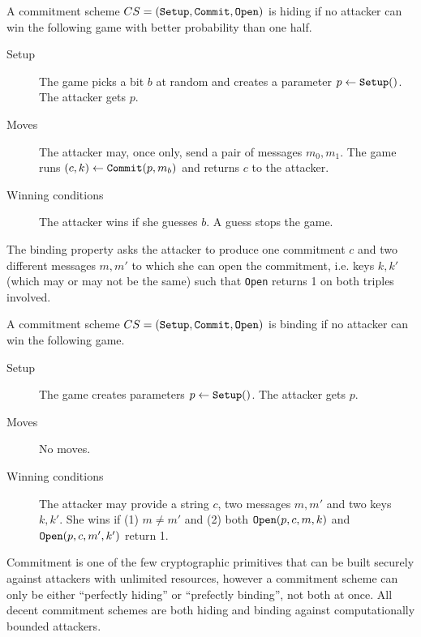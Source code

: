\documentclass[envcountsame]{llncs}
\newcommand{\alg}[1]{\textup{\texttt{#1}}}
\begin{document}
\begin{definition}
A commitment scheme $CS = (\alg{Setup}, \alg{Commit}, \alg{Open})$ is hiding if
no attacker can win the following game with better probability than one half.

\begin{description}
\item[Setup]
The game picks a bit $b$ at random and creates a parameter $p \gets
\alg{Setup}()$. The attacker gets $p$.

\item[Moves]
The attacker may, once only, send a pair of messages $m_0, m_1$. The game runs
$(c, k) \gets \alg{Commit}(p, m_b)$ and returns $c$ to the attacker.

\item[Winning conditions]
The attacker wins if she guesses $b$. A guess stops the game.
\end{description}
\end{definition}

The binding property asks the attacker to produce one commitment $c$ and two
different messages $m, m'$ to which she can open the commitment, i.e. keys
$k, k'$ (which may or may not be the same) such that \alg{Open} returns 1 on
both triples involved.

\begin{definition}
A commitment scheme $CS = (\alg{Setup}, \alg{Commit}, \alg{Open})$ is binding
if no attacker can win the following game.

\begin{description}
\item[Setup]
The game creates parameters $p \gets \alg{Setup}()$. The attacker gets $p$.

\item[Moves]
No moves.

\item[Winning conditions]
The attacker may provide a string $c$, two messages $m, m'$ and two keys $k,
k'$. She wins if (1) $m \neq m'$ and (2) both $\alg{Open}(p, c, m, k)$ and
$\alg{Open}(p, c, m', k')$ return 1.
\end{description}
\end{definition}

Commitment is one of the few cryptographic primitives that can be built securely
against attackers with unlimited resources, however a commitment scheme can only
be either ``perfectly hiding'' or ``prefectly binding'', not both at once.
All decent commitment schemes are both hiding and binding against
computationally bounded attackers.
\end{document}
